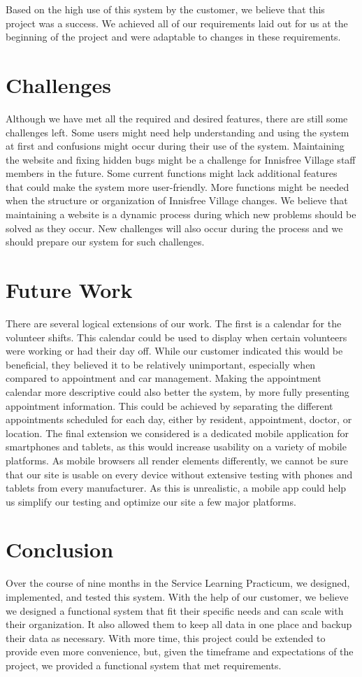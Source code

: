 \documentclass{sig-alternate}
\begin{document}
Based on the high use of this system by the customer, we believe that this project was a success.  We achieved all of our requirements laid out for us at the beginning of the project and were adaptable to changes in these requirements.

\section{Challenges}
Although we have met all the required and desired features, there are still some challenges left. Some users might need help understanding and using the system at first and confusions might occur during their use of the system. Maintaining the website and fixing hidden bugs might be a challenge for Innisfree Village staff members in the future. Some current functions might lack additional features that could make the system more user-friendly. More functions might be needed when the structure or organization of Innisfree Village changes. We believe that maintaining a website is a dynamic process during which new problems should be solved as they occur. New challenges will also occur during the process and we should prepare our system for such challenges.

\section{Future Work}
There are several logical extensions of our work. The first is a calendar for the volunteer shifts. This calendar could be used to display when certain volunteers were working or had their day off. While our customer indicated this would be beneficial, they believed it to be relatively unimportant, especially when compared to appointment and car management. Making the appointment calendar more descriptive could also better the system, by more fully presenting appointment information. This could be achieved by separating the different appointments scheduled for each day, either by resident, appointment, doctor, or location. The final extension we considered is a dedicated mobile application for smartphones and tablets, as this would increase usability on a variety of mobile platforms. As mobile browsers all render elements differently, we cannot be sure that our site is usable on every device without extensive testing with phones and tablets from every manufacturer. As this is unrealistic, a mobile app could help us simplify our testing and optimize our site a few major platforms.

\section{Conclusion}
Over the course of nine months in the Service Learning Practicum, we designed, implemented, and tested this system.  With the help of our customer, we believe we designed a functional system that fit their specific needs and can scale with their organization.  It also allowed them to keep all data in one place and backup their data as necessary.  With more time, this project could be extended to provide even more convenience, but, given the timeframe and expectations of the project, we provided a functional system that met requirements.  
\end{document}

